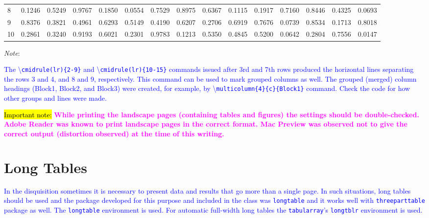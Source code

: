 \documentclass[phd,showgrids]{ndsu-thesis-2022}
\newcommand\italk[1]{\textcolor{blue}{#1}}  %
\newcommand\cmd[1]{\textbackslash\texttt{#1}}  %
\newcommand\vb[1]{\textcolor{blue}{\texttt{#1}}}%
\begin{document}
\begin{landscape}
\begin{table}[p]
{\begin{tabular}{l  rrrr  cccc  llll  rr}
8 & 0.1246 & 0.5249 & 0.9767 & 0.1850 & 0.0554 & 0.7529 & 0.8975 & 0.6367 & 0.1115 & 0.1917 & 0.7160 & 0.8446 & 0.4325 & 0.0693 \\
\cmidrule(lr){10-15}
9 & 0.8376 & 0.3821 & 0.4961 & 0.6293 & 0.5149 & 0.4190 & 0.6207 & 0.2706 & 0.6919 & 0.7676 & 0.0739 & 0.8534 & 0.1713 & 0.8018 \\
10 & 0.2861 & 0.3240 & 0.9193 & 0.6021 & 0.2301 & 0.9783 & 0.1213 & 0.5350 & 0.4845 & 0.5200 & 0.0642 & 0.2804 & 0.7556 & 0.0147 \\
\bottomrule
\end{tabular}
}    
\begin{tablenotes}[flushleft]
\footnotesize
\item \hspace{-1ex} \emph{Note}: \italk{The \cmd{cmidrule(lr)\{2-9\}} and \cmd{cmidrule(lr)\{10-15\}} commands issued after 3rd and 7th rows produced the horizontal lines separating the rows 3 and 4, and 8 and 9, respectively. This command can be used to mark grouped columns as well. The grouped (merged) column headings (Block1, Block2, and Block3) were created, for example, by \cmd{multicolumn\{4\}\{c\}\{Block1\}} command. Check the code for how other groups and lines were made.
\item \vspace{4ex}
\italk{\hl{Important note:}} \textcolor{magenta}{\bfseries While printing the landscape pages (containing tables and figures) the settings should be double-checked. Adobe Reader was known to print landscape pages in the correct format. Mac Preview was observed not to give the correct output (distortion observed) at the time of this writing.}
}  
\end{tablenotes}  
\label{tab210}
\end{table}
\end{landscape}

\section{Long Tables}
\italk{In the disquisition sometimes it is necessary to present data and results that go more than a single page. In such situations, long tables should be used and the package developed for this purpose and included in the class was 
\vb{longtable} and it works well with \vb{threeparttable} package as well. The \vb{longtable} environment is used. For automatic full-width long tables the \vb{tabularray}'s \vb{longtblr} environment is used.} 
\end{document}
